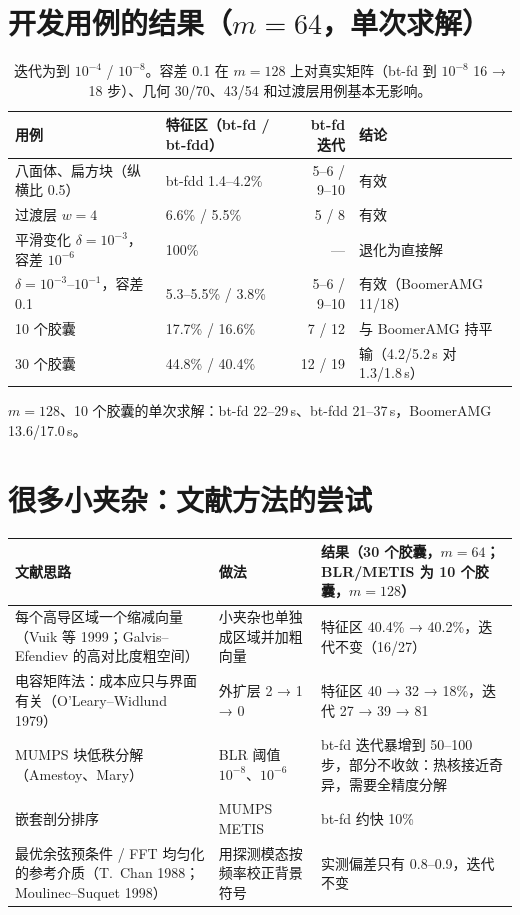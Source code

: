 \documentclass[11pt,a4paper]{ctexart}
\begin{document}
\section{开发用例的结果（$m=64$，单次求解）}
\begin{table}[H]
\centering\footnotesize
\begin{tabular}{llrl}
\toprule
用例 & 特征区（bt-fd / bt-fdd） & bt-fd 迭代 & 结论 \\
\midrule
八面体、扁方块（纵横比 0.5） & bt-fdd 1.4--4.2\% & 5--6 / 9--10 & 有效 \\
过渡层 $w=4$ & 6.6\% / 5.5\% & 5 / 8 & 有效 \\
平滑变化 $\delta=10^{-3}$，容差 $10^{-6}$ & 100\% & --- & 退化为直接解 \\
$\delta=10^{-3}$--$10^{-1}$，容差 0.1 & 5.3--5.5\% / 3.8\% & 5--6 / 9--10 & 有效（BoomerAMG 11/18） \\
10 个胶囊 & 17.7\% / 16.6\% & 7 / 12 & 与 BoomerAMG 持平 \\
30 个胶囊 & 44.8\% / 40.4\% & 12 / 19 & 输（4.2/5.2\,s 对 1.3/1.8\,s） \\
\bottomrule
\end{tabular}
\caption{迭代为到 $10^{-4}$ / $10^{-8}$。容差 0.1 在 $m=128$ 上对真实矩阵（bt-fd 到 $10^{-8}$ 16 → 18 步）、几何 30/70、43/54 和过渡层用例基本无影响。}
\end{table}
$m=128$、10 个胶囊的单次求解：bt-fd 22--29\,s、bt-fdd 21--37\,s，BoomerAMG 13.6/17.0\,s。

\section{很多小夹杂：文献方法的尝试}
\begin{table}[H]
\centering\footnotesize
\begin{tabular}{p{4.6cm}p{4.4cm}p{5.2cm}}
\toprule
文献思路 & 做法 & 结果（30 个胶囊，$m=64$；BLR/METIS 为 10 个胶囊，$m=128$） \\
\midrule
每个高导区域一个缩减向量（Vuik 等 1999；Galvis--Efendiev 的高对比度粗空间） & 小夹杂也单独成区域并加粗向量 & 特征区 40.4\% → 40.2\%，迭代不变（16/27） \\
电容矩阵法：成本应只与界面有关（O'Leary--Widlund 1979） & 外扩层 2 → 1 → 0 & 特征区 40 → 32 → 18\%，迭代 27 → 39 → 81 \\
MUMPS 块低秩分解（Amestoy、Mary） & BLR 阈值 $10^{-8}$、$10^{-6}$ & bt-fd 迭代暴增到 50--100 步，部分不收敛：热核接近奇异，需要全精度分解 \\
嵌套剖分排序 & MUMPS METIS & bt-fd 约快 10\% \\
最优余弦预条件 / FFT 均匀化的参考介质（T.~Chan 1988；Moulinec--Suquet 1998） & 用探测模态按频率校正背景符号 & 实测偏差只有 0.8--0.9，迭代不变 \\
\bottomrule
\end{tabular}
\end{table}
\end{document}
